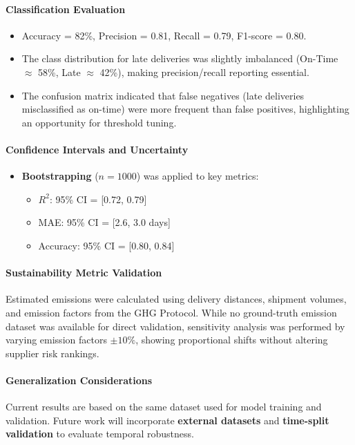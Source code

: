 \documentclass[10pt, twocolumn]{article}
\begin{document}
\paragraph{Classification Evaluation}
\begin{itemize}
    \item Accuracy = 82\%, Precision = 0.81, Recall = 0.79, F1-score = 0.80.
    \item The class distribution for late deliveries was slightly imbalanced (On-Time $\approx$ 58\%, Late $\approx$ 42\%), making precision/recall reporting essential.
    \item The confusion matrix indicated that false negatives (late deliveries misclassified as on-time) were more frequent than false positives, highlighting an opportunity for threshold tuning.
\end{itemize}

\paragraph{Confidence Intervals and Uncertainty}
\begin{itemize}
    \item \textbf{Bootstrapping} ($n=1000$) was applied to key metrics:
    \begin{itemize}
        \item $R^2$: 95\% CI = [0.72, 0.79]
        \item MAE: 95\% CI = [2.6, 3.0 days]
        \item Accuracy: 95\% CI = [0.80, 0.84]
    \end{itemize}
\end{itemize}

\paragraph{Sustainability Metric Validation}
Estimated emissions were calculated using delivery distances, shipment volumes, and emission factors from the GHG Protocol. While no ground-truth emission dataset was available for direct validation, sensitivity analysis was performed by varying emission factors $\pm 10\%$, showing proportional shifts without altering supplier risk rankings.

\paragraph{Generalization Considerations}
Current results are based on the same dataset used for model training and validation. Future work will incorporate \textbf{external datasets} and \textbf{time-split validation} to evaluate temporal robustness.
\end{document}
